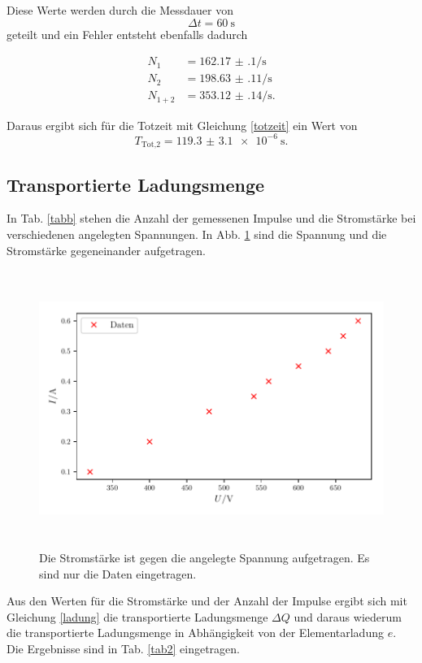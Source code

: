 \noindent Diese Werte werden durch die Messdauer von
\begin{equation*}
    \Delta t = \SI{60}{\second}
\end{equation*}
geteilt und ein Fehler entsteht ebenfalls dadurch %

\begin{align*} 
   N_1 &= \num{162.17(10)} \si{\per\second}\\
   N_2 &= \num{198.63(11)} \si{\per\second} \\
   N_{1+2} &=\num{353.12(14)} \si{\per\second}.
\end{align*}

\noindent Daraus ergibt sich für die Totzeit mit Gleichung \eqref{totzeit}
ein Wert von 
\begin{equation*} 
    T_\text{Tot,2} = \SI{119.3(31)e-6}{\second}.
\end{equation*} 

\subsection{Transportierte Ladungsmenge}
In Tab. \ref{tabb} stehen die Anzahl der gemessenen Impulse und die Stromstärke bei verschiedenen angelegten Spannungen.
In Abb. \ref{fig2} sind die Spannung und die Stromstärke gegeneinander aufgetragen. 



\begin{figure}
    \centering
    \includegraphics[width=15cm, height=9cm]{build/plot2.pdf}
    \caption{Die Stromstärke ist gegen die angelegte Spannung aufgetragen. Es sind nur die Daten eingetragen.}
    \label{fig2}
\end{figure}

\noindent Aus den Werten für die Stromstärke und der Anzahl der Impulse ergibt sich mit Gleichung \eqref{ladung} die transportierte Ladungsmenge $\Delta Q$ und daraus wiederum die transportierte Ladungsmenge in Abhängigkeit von der Elementarladung $e$. Die Ergebnisse sind in Tab. \ref{tab2} eingetragen. 




